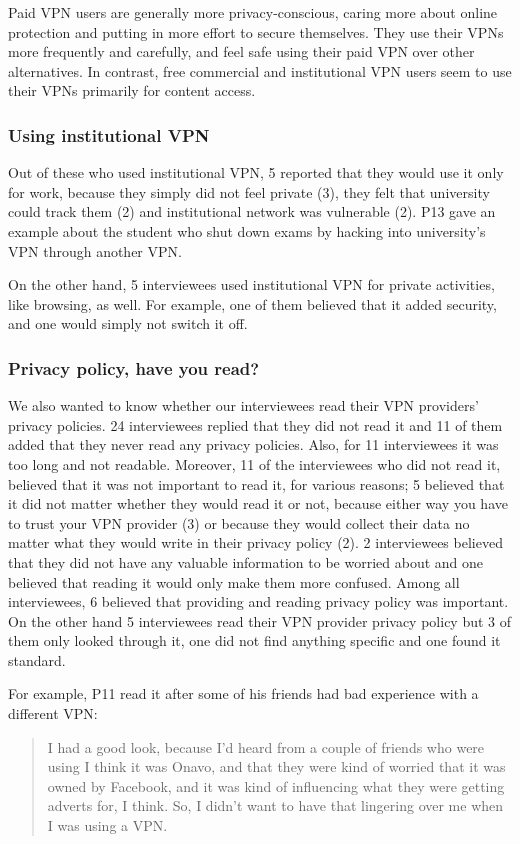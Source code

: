 Paid VPN users are generally more privacy-conscious, caring more about online
protection and putting in more effort to secure themselves. They use their
VPNs more frequently and carefully, and feel safe using their paid VPN over
other alternatives. In contrast, free commercial and institutional VPN users
seem to use their VPNs primarily for content access.


\subsubsection{Using institutional VPN} Out of these who used institutional
VPN, 5 reported that they would use it only for work, because they simply did
not feel private (3), they felt that university could track them (2) and
institutional network was vulnerable  (2). P13 gave an example about the
student who shut down exams by hacking into university's VPN through another
VPN. %

On the other hand, 5 interviewees used institutional VPN for private
activities, like browsing, as well. For example, one of them believed that it
added security, and one would simply not switch it off. 

\subsubsection{Privacy policy, have you read?} We also wanted to know whether
our interviewees read their VPN providers’ privacy policies. 24 interviewees
replied that they did not read it and 11 of them added that they never read
any privacy policies. Also, for 11 interviewees it was too long and not
readable. Moreover, 11 of the interviewees who did not read it, believed that
it was not important to read it, for various reasons; 5 believed that it did
not matter whether they would read it or not, because either way you have to
trust your VPN provider (3) or because they would collect their data no matter
what they would write in their privacy policy (2). 2 interviewees believed
that they did not have any valuable information to be worried about and one
believed that reading it would only make them more confused. Among all
interviewees, 6 believed that providing and reading privacy policy was
important. On the other hand 5 interviewees read their VPN provider privacy
policy but 3 of them only looked through it, one did not find anything
specific and one found it standard. 

For example, P11 read it after some of his friends had bad experience with a
different VPN: \begin{quote}I had a good look, because I'd heard from a couple of friends
who were using I think it was Onavo, and that they were kind of worried
that it was owned by Facebook, and it was kind of influencing what they were
getting adverts for, I think.  So, I didn't want to have that lingering
over me when I was using a VPN.  \end{quote}

